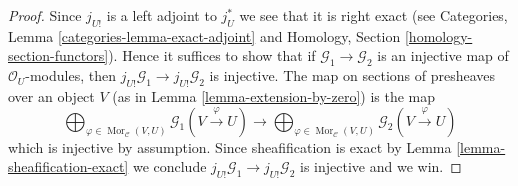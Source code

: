 \documentclass[10pt,a4paper]{amsart}
\theoremstyle{plain}
\theoremstyle{definition}
\theoremstyle{remark}
\numberwithin{equation}{subsection}
\def\Mor{\mathop{\mathrm{Mor}}\nolimits}
\begin{document}
\begin{proof}
Since $j_{U!}$ is a left adjoint to $j_U^*$ we see that it is right exact
(see
Categories, Lemma \ref{categories-lemma-exact-adjoint}
and
Homology, Section \ref{homology-section-functors}).
Hence it suffices to show that if $\mathcal{G}_1 \to \mathcal{G}_2$
is an injective map of $\mathcal{O}_U$-modules, then
$j_{U!}\mathcal{G}_1 \to j_{U!}\mathcal{G}_2$ is injective.
The map on sections of presheaves over an object $V$
(as in Lemma \ref{lemma-extension-by-zero}) is the map
$$
\bigoplus\nolimits_{\varphi \in \Mor_\mathcal{C}(V, U)}
\mathcal{G}_1(V \xrightarrow{\varphi} U)
\longrightarrow
\bigoplus\nolimits_{\varphi \in \Mor_\mathcal{C}(V, U)}
\mathcal{G}_2(V \xrightarrow{\varphi} U)
$$
which is injective by assumption. Since sheafification is exact by
Lemma \ref{lemma-sheafification-exact}
we conclude $j_{U!}\mathcal{G}_1 \to j_{U!}\mathcal{G}_2$ is injective and
we win.
\end{proof}
\end{document}
